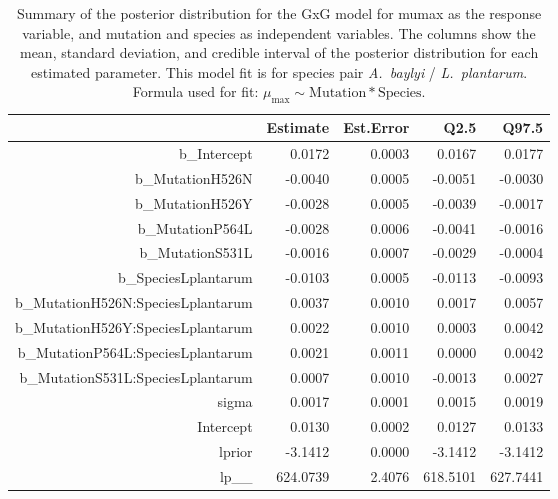 \begin{table}[ht]
\centering
\begin{tabular}{rrrrr}
  \hline
 & Estimate & Est.Error & Q2.5 & Q97.5 \\ 
  \hline
b\_Intercept & 0.0172 & 0.0003 & 0.0167 & 0.0177 \\ 
  b\_MutationH526N & -0.0040 & 0.0005 & -0.0051 & -0.0030 \\ 
  b\_MutationH526Y & -0.0028 & 0.0005 & -0.0039 & -0.0017 \\ 
  b\_MutationP564L & -0.0028 & 0.0006 & -0.0041 & -0.0016 \\ 
  b\_MutationS531L & -0.0016 & 0.0007 & -0.0029 & -0.0004 \\ 
  b\_SpeciesLplantarum & -0.0103 & 0.0005 & -0.0113 & -0.0093 \\ 
  b\_MutationH526N:SpeciesLplantarum & 0.0037 & 0.0010 & 0.0017 & 0.0057 \\ 
  b\_MutationH526Y:SpeciesLplantarum & 0.0022 & 0.0010 & 0.0003 & 0.0042 \\ 
  b\_MutationP564L:SpeciesLplantarum & 0.0021 & 0.0011 & 0.0000 & 0.0042 \\ 
  b\_MutationS531L:SpeciesLplantarum & 0.0007 & 0.0010 & -0.0013 & 0.0027 \\ 
  sigma & 0.0017 & 0.0001 & 0.0015 & 0.0019 \\ 
  Intercept & 0.0130 & 0.0002 & 0.0127 & 0.0133 \\ 
  lprior & -3.1412 & 0.0000 & -3.1412 & -3.1412 \\ 
  lp\_\_ & 624.0739 & 2.4076 & 618.5101 & 627.7441 \\ 
   \hline
\end{tabular}
\caption{Summary of the posterior distribution for the GxG model for mumax as the response variable, and mutation and species as independent variables. The columns show the mean, standard deviation, and credible interval of the posterior distribution for each estimated parameter. This model fit is for species pair \textit{A.~baylyi} / \textit{L.~plantarum}.  Formula used for fit: $\mu_{\text{max}} \sim \text{Mutation} * \text{Species}$.} 
\label{supptab:GxG_mumax_AB_LP}
\end{table}



